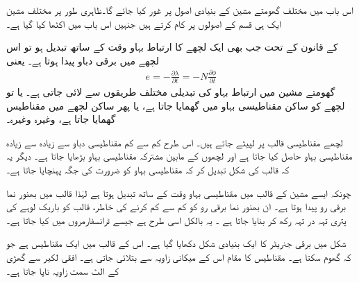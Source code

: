 اس باب میں مختلف گھومتے مشین کے بنیادی اصول پر غور کیا جائے گا۔ظاہری طور پر مختلف مشین ایک ہی قسم کے اصولوں پر کام کرتے ہیں جنہیں اس باب میں اکٹھا کیا گیا ہے۔

 کے قانون کے تحت جب بھی ایک لچھے کا ارتباط بہاو   وقت کے ساتھ تبدیل ہو تو اس لچھے میں برقی دباو پیدا ہوتا ہے۔ یعنی
\begin{align}
e=-\frac{\partial \lambda}{\partial t}=-N \frac{\partial \phi}{\partial t}
\end{align}
گھومتے مشین میں ارتباط بہاو کی تبدیلی مختلف طریقوں سے لائی جاتی ہے۔ یا تو لچھے کو ساکن مقناطیسی بہاو میں گھمایا جاتا ہے، یا پھر ساکن لچھے میں مقناطیس گھمایا جاتا ہے، وغیرہ وغیرہ۔

لچھے مقناطیسی قالب  پر لپیٹے جاتے ہیں۔ اس طرح کم سے کم مقناطیسی دباو سے زیادہ سے زیادہ مقناطیسی بہاو حاصل کیا جاتا ہے اور لچھوں کے مابین مشترکہ مقناطیسی بہاو بڑھایا جاتا ہے۔ دیگر یہ کہ قالب کی شکل تبدیل کر کہ مقناطیسی بہاو کو ضرورت کی جگہ پہنچایا جاتا ہے۔

چونکہ ایسے مشین کے قالب میں مقناطیسی بہاو وقت کے ساتھ تبدیل ہوتا ہے لہٰذا قالب میں بھنور نما برقی رو پیدا ہوتا ہے۔ ان بھنور نما برقی رو کو کم سے کم کرنے کی خاطر، قالب کو باریک لوہے کی پتری تہہ در تہہ رکھ کر بنایا جاتا ہے ۔ یہ بالکل اسی طرح ہے جیسے ٹرانسفارمروں میں کیا جاتا ہے۔

شکل   میں  برقی جنریٹر کا ایک بنیادی شکل دکھایا گیا ہے۔ اس کے قالب میں ایک مقناطیس ہے جو کہ گھوم سکتا ہے۔ مقناطیس کا مقام اس کے میکانی زاویہ  سے بتلائی جاتی ہے۔ افقی لکیر سے گھڑی کے الٹ سمت زاویہ  ناپا جاتا ہے۔

